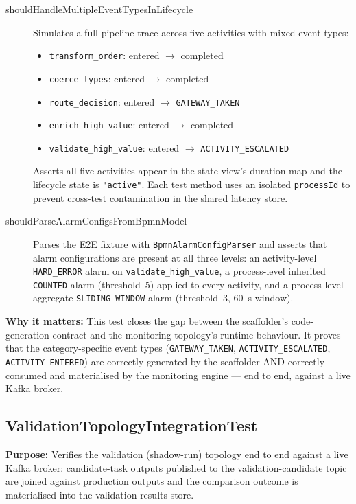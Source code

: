 \begin{description}
\item[shouldHandleMultipleEventTypesInLifecycle] Simulates a
full pipeline trace across five activities with mixed event types:
\begin{itemize}
\item \texttt{transform\_order}: entered $\to$ completed
\item \texttt{coerce\_types}: entered $\to$ completed
\item \texttt{route\_decision}: entered $\to$ \texttt{GATEWAY\_TAKEN}
\item \texttt{enrich\_high\_value}: entered $\to$ completed
\item \texttt{validate\_high\_value}: entered $\to$
\texttt{ACTIVITY\_ESCALATED}
\end{itemize}
Asserts all five activities appear in the state view's duration map and
the lifecycle state is \texttt{"active"}. Each test method uses an
isolated \texttt{processId} to prevent cross-test contamination in the
shared latency store.

\item[shouldParseAlarmConfigsFromBpmnModel] Parses the E2E fixture with
\texttt{BpmnAlarmConfigParser} and asserts that alarm configurations are
present at all three levels: an activity-level \texttt{HARD\_ERROR} alarm
on \texttt{validate\_high\_value}, a process-level inherited
\texttt{COUNTED} alarm (threshold~5) applied to every activity, and a
process-level aggregate \texttt{SLIDING\_WINDOW} alarm (threshold~3,
60~s window).

\end{description}

\textbf{Why it matters:} This test closes the gap between the scaffolder's
code-generation contract and the monitoring topology's runtime behaviour.
It proves that the category-specific event types (\texttt{GATEWAY\_TAKEN},
\texttt{ACTIVITY\_ESCALATED}, \texttt{ACTIVITY\_ENTERED}) are correctly
generated by the scaffolder AND correctly consumed and materialised by
the monitoring engine --- end to end, against a live Kafka broker.


\subsection{ValidationTopologyIntegrationTest}
\label{it:validationTopology}

\textbf{Purpose:} Verifies the validation (shadow-run) topology end to end
against a live Kafka broker: candidate-task outputs published to the
validation-candidate topic are joined against production outputs and the
comparison outcome is materialised into the validation results store.

